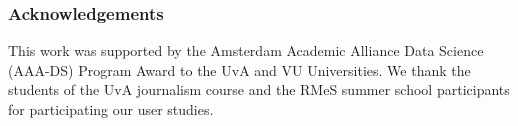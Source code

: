 \documentclass{llncs}
\begin{document}
\subsubsection{Acknowledgements} This work was supported by the Amsterdam Academic Alliance Data Science (AAA-DS) Program Award to the UvA and VU Universities.
We thank the students of the UvA journalism course and the RMeS summer school participants for participating our user studies. 


 
\end{document}
